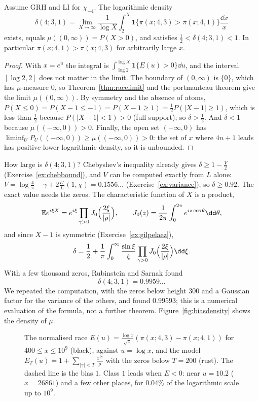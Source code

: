\begin{corollary}\label{cor:biasdensity}
Assume GRH and LI for $\chi_{-4}$. The logarithmic density
\[
\delta(4;3,1)=\lim_{X\to\infty}\frac1{\log X}\int_2^X\mathbf 1\{\pi(x;4,3)>\pi(x;4,1)\}\frac{\dd x}x
\]
exists, equals $\mu((0,\infty))=P(X>0)$, and satisfies $\frac12<\delta(4;3,1)<1$. In particular $\pi(x;4,1)>\pi(x;4,3)$ for arbitrarily large $x$.
\end{corollary}
\begin{proof}
With $x=e^u$ the integral is $\int_{\log2}^{\log X}\mathbf 1\{E(u)>0\}\dd u$, and the interval $[\log2,2]$ does not matter in the limit. The boundary of $(0,\infty)$ is $\{0\}$, which has $\mu$-measure $0$, so Theorem~\ref{thm:racelimit} and the portmanteau theorem give the limit $\mu((0,\infty))$. By symmetry and the absence of atoms, $P(X\le0)=P(X-1\le-1)=P(X-1\ge1)=\frac12P(|X-1|\ge1)$, which is less than $\frac12$ because $P(|X-1|<1)>0$ (full support); so $\delta>\frac12$. And $\delta<1$ because $\mu((-\infty,0))>0$. Finally, the open set $(-\infty,0)$ has $\liminf_U P_U((-\infty,0))\ge\mu((-\infty,0))>0$: the set of $x$ where $4n+1$ leads has positive lower logarithmic density, so it is unbounded.
\end{proof}

How large is $\delta(4;3,1)$? Chebyshev's inequality already gives $\delta\ge1-\frac V2$ (Exercise~\ref{ex:chebbound}), and $V$ can be computed exactly from $L$ alone: $V=\log\frac4\pi-\gamma+2\frac{L'}L(1,\chi)=0.1556\ldots$ (Exercise~\ref{ex:variance}), so $\delta\ge0.92$. The exact value needs the zeros. The characteristic function of $X$ is a product,
\[
\mathbb Ee^{i\xi X}=e^{i\xi}\prod_{\gamma>0}J_0\Bigl(\frac{2\xi}{|\rho|}\Bigr),\qquad J_0(z)=\frac1{2\pi}\int_0^{2\pi}e^{iz\cos\theta}\dd\theta,
\]
and since $X-1$ is symmetric (Exercise~\ref{ex:gilpelaez}),
\[
\delta=\frac12+\frac1\pi\int_0^\infty\frac{\sin\xi}\xi\prod_{\gamma>0}J_0\Bigl(\frac{2\xi}{|\rho|}\Bigr)\dd\xi.
\] With a few thousand zeros, Rubinstein and Sarnak found
\[
\delta(4;3,1)=0.9959\ldots
\]
We repeated the computation, with the zeros below height $300$ and a Gaussian factor for the variance of the others, and found $0.99593$; this is a numerical evaluation of the formula, not a further theorem. Figure~\ref{fig:biasdensity} shows the density of $\mu$.

\begin{figure}[ht]
\centering{}
\caption{The normalised race $E(u)=\frac{\log x}{\sqrt x}(\pi(x;4,3)-\pi(x;4,1))$ for $400\le x\le10^9$ (black), against $u=\log x$, and the model $E_T(u)=1+\sum_{|\gamma|<T}\frac{x^{i\gamma}}\rho$ with the zeros below $T=200$ (rust). The dashed line is the bias $1$. Class $1$ leads when $E<0$: near $u=10.2$ ($x=26861$) and a few other places, for $0.04\%$ of the logarithmic scale up to $10^9$.}
\label{fig:race}
\end{figure}

